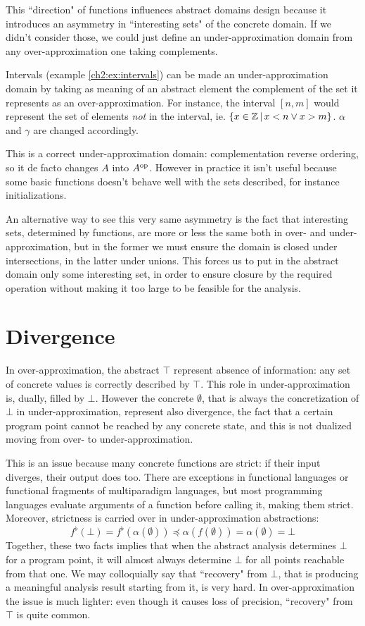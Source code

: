 This ``direction" of functions influences abstract domains design because it introduces an asymmetry in ``interesting sets" of the concrete domain.
If we didn't consider those, we could just define an under-approximation domain from any over-approximation one taking complements.
\begin{example}
	Intervals (example \ref{ch2:ex:intervals}) can be made an under-approximation domain by taking as meaning of an abstract element the complement of the set it represents as an over-approximation.
	For instance, the interval $[n, m]$ would represent the set of elements \textit{not} in the interval, ie. $\{ x \in \mathbb{Z} \,\vert\, x < n \lor x > m \}$.
	$\alpha$ and $\gamma$ are changed accordingly.

	This is a correct under-approximation domain: complementation reverse ordering, so it de facto changes $A$ into $A^{\text{op}}$. However in practice it isn't useful because some basic functions doesn't behave well with the sets described, for instance initializations.
\end{example}

An alternative way to see this very same asymmetry is the fact that interesting sets, determined by functions, are more or less the same both in over- and under-approximation, but in the former we must ensure the domain is closed under intersections, in the latter under unions. This forces us to put in the abstract domain only some interesting set, in order to ensure closure by the required operation without making it too large to be feasible for the analysis.

\section{Divergence}
In over-approximation, the abstract $\top$ represent absence of information: any set of concrete values is correctly described by $\top$. This role in under-approximation is, dually, filled by $\bot$.
However the concrete $\emptyset$, that is always the concretization of $\bot$ in under-approximation, represent also divergence, the fact that a certain program point cannot be reached by any concrete state, and this is not dualized moving from over- to under-approximation.

This is an issue because many concrete functions are strict: if their input diverges, their output does too. There are exceptions in functional languages or functional fragments of multiparadigm languages, but most programming languages evaluate arguments of a function before calling it, making them strict. Moreover, strictness is carried over in under-approximation abstractions:
\[
f^{\flat}(\bot) = f^{\flat}(\alpha(\emptyset)) \preceq \alpha(f(\emptyset)) = \alpha(\emptyset) = \bot
\]
Together, these two facts implies that when the abstract analysis determines $\bot$ for a program point, it will almost always determine $\bot$ for all points reachable from that one. We may colloquially say that ``recovery" from $\bot$, that is producing a meaningful analysis result starting from it, is very hard.
In over-approximation the issue is much lighter: even though it causes loss of precision, ``recovery" from $\top$ is quite common.

